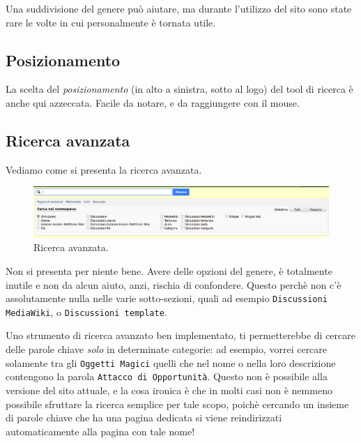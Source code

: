 Una suddivisione del genere può aiutare, ma durante l'utilizzo del sito sono state rare le volte in cui personalmente 
è tornata utile.

\subsection{Posizionamento}

La scelta del \emph{posizionamento} (in alto a sinistra, sotto al logo) del tool di ricerca è anche qui azzeccata. 
Facile da notare, e da raggiungere con il mouse.

\subsection{Ricerca avanzata}

Vediamo come si presenta la ricerca avanzata.

\begin{figure}[hbt]
    \includegraphics[width=\textwidth]{img/ricerca3.png}
    \caption{Ricerca avanzata.}
\end{figure}

Non si presenta per niente bene. Avere delle opzioni del genere, è totalmente inutile e non da alcun aiuto, anzi, 
rischia di confondere. Questo perchè non c'è assolutamente nulla nelle varie sotto-sezioni, quali ad esempio
\texttt{Discussioni MediaWiki}, o \texttt{Discussioni template}.\par
Uno strumento di ricerca avanzato ben implementato, ti permetterebbe di cercare delle parole chiave \emph{solo}
in determinate categorie: ad esempio, vorrei cercare solamente tra gli \texttt{Oggetti Magici} quelli che nel nome
o nella loro descrizione contengono la parola \texttt{Attacco di Opportunità}. Questo non è possibile alla versione
del sito attuale, e la cosa ironica è che in molti casi non è nemmeno possibile sfruttare la ricerca semplice per tale
scopo, poichè cercando un insieme di parole chiave che ha una pagina dedicata si viene reindirizzati automaticamente alla pagina
con tale nome!